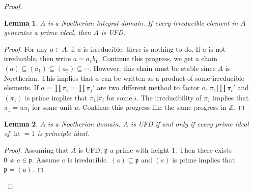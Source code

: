 \documentclass[cs4size]{article}
\newcommand{\su}{\subseteq}
\newcommand{\frp}{\mathfrak{p}}
\newcommand{\bb}{\mathbb}
\DeclareMathOperator{\height}{ht}
\newtheorem{lem}{Lemma}
\begin{document}
\begin{proof}
\begin{lem}\label{lem:C}
$A$ is a Noetherian integral domain. If every irreducible element in $A$ generates a prime ideal, then $A$ is UFD.
\end{lem}
\begin{proof}
For any $a\in A$, if $a$ is irreducible, there is nothing to do. If $a$ is not irreducible, then write $a=a_1b_1$. Continue this progress, we get a chain $(a)\su (a_1)\su (a_2)\su\cdots$. However, this chain must be stable since $A$ is Noetherian. This implies that $a$ can be written as a product of some irreducible elements. If $a=\prod\pi_i=\prod\pi_j'$ are two different method to factor $a$. $\pi_1|\prod\pi_i'$ and $(\pi_1)$ is prime implies that $\pi_1|\pi_i$ for some $i$. The irreducibility of $\pi_1$ implies that $\pi_1=u\pi_i$ for some unit $u$. Continue this progress like the same progress in $\bb{Z}$.
\end{proof}
\begin{lem}\label{lem:D}
$A$ is a Noetherian domain. $A$ is UFD if and only if every prime ideal of $\height=1$ is principle ideal.
\end{lem}
\begin{proof}
Assuming that $A$ is UFD, $\frp$ a prime with height $1$. Then there exists $0\neq a\in \frp$. Assume $a$ is irreducible. $(a)\su \frp$ and $(a)$ is prime implies that $\frp=(a)$.


\end{proof}
\end{proof}
\end{document}
